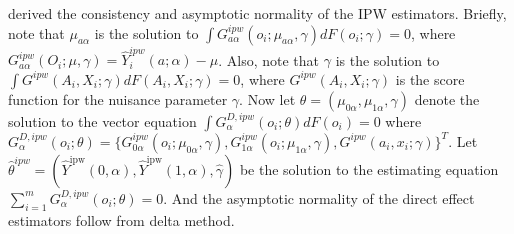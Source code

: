 \documentclass[oupdraft]{bio}
\begin{document}




\citet{PerezHeydrich2014interference} derived the consistency and asymptotic normality of the IPW estimators. 
Briefly, note that $\mu_{a\alpha}$  is the solution to $\int G^{ipw}_{a\alpha}(o_i;\mu_{a\alpha},\gamma)dF(o_i;\gamma) = 0$, where $G^{ipw}_{a\alpha}(O_i;\mu,\gamma) =\widehat{Y}_i^{ipw}(a;\alpha)- \mu$. Also, note that $\gamma$ is the solution to $\int G^{ipw}(A_i,X_i;\gamma)dF(A_i,X_i;\gamma)=0$, where $G^{ipw}(A_i,X_i;\gamma)$ is the score function for the nuisance parameter $\gamma$. Now let $\theta=(\mu_{0\alpha},\mu_{1\alpha},\gamma)$ denote the solution to the vector equation $\int G^{D, ipw}_{\alpha}(o_i;\theta) dF(o_i) = 0$ where $G^{ D,ipw}_{\alpha}(o_i;\theta)=\{G^{ipw}_{0\alpha}(o_i;\mu_{0\alpha},\gamma),G^{ipw}_{1\alpha}(o_i;\mu_{1\alpha},\gamma),G^{ipw}(a_i,x_i;\gamma)\}^T$. Let $\hat\theta^{ipw}=(\hat Y^{\text{ipw}}(0,\alpha),\hat Y^{\text{ipw}}(1,\alpha),\hat\gamma)$ be the solution to the estimating equation $\sum_{i=1}^m G^{D,ipw}_{\alpha}(o_i;\theta)=0$. And the asymptotic normality of the direct effect estimators follow from delta method.

\end{document}
